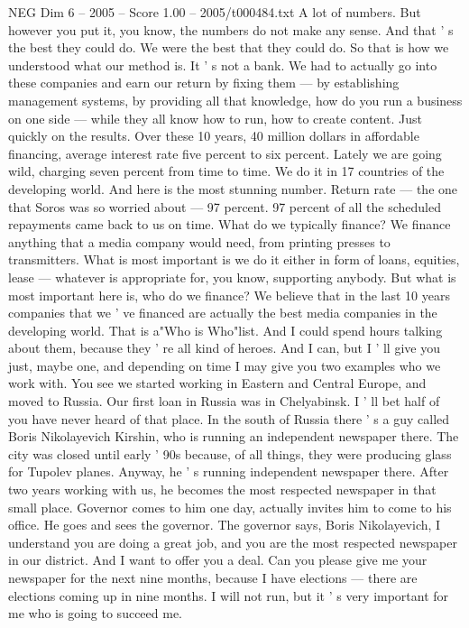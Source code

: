 \begin{textsample}{NEG Dim 6 – 2005 – Score 1.00 – 2005/t000484.txt}
A lot of numbers.
But however you put it, you know, the numbers do not make any sense.
And that ' s the best they could do.
We were the best that they could do.
So that is how we understood what our method is.
It ' s not a bank.
We had to actually go into these companies and earn our return by fixing them — by establishing management systems, by providing all that knowledge, how do you run a business on one side — while they all know how to run, how to create content.
Just quickly on the results.
Over these 10 years, 40 million dollars in affordable financing, average interest rate five percent to six percent.
Lately we are going wild, charging seven percent from time to time.
We do it in 17 countries of the developing world.
And here is the most stunning number.
Return rate — the one that Soros was so worried about — 97 percent. 97 percent of all the scheduled repayments came back to us on time.
What do we typically finance?
We finance anything that a media company would need, from printing presses to transmitters.
What is most important is we do it either in form of loans, equities, lease — whatever is appropriate for, you know, supporting anybody.
But what is most important here is, who do we finance?
We believe that in the last 10 years companies that we ' ve financed are actually the best media companies in the developing world.
That is a"Who is Who"list.
And I could spend hours talking about them, because they ' re all kind of heroes.
And I can, but I ' ll give you just, maybe one, and depending on time I may give you two examples who we work with.
You see we started working in Eastern and Central Europe, and moved to Russia.
Our first loan in Russia was in Chelyabinsk.
I ' ll bet half of you have never heard of that place.
In the south of Russia there ' s a guy called Boris Nikolayevich Kirshin, who is running an independent newspaper there.
The city was closed until early ' 90s because, of all things, they were producing glass for Tupolev planes.
Anyway, he ' s running independent newspaper there.
After two years working with us, he becomes the most respected newspaper in that small place.
Governor comes to him one day, actually invites him to come to his office.
He goes and sees the governor.
The governor says, Boris Nikolayevich, I understand you are doing a great job, and you are the most respected newspaper in our district.
And I want to offer you a deal.
Can you please give me your newspaper for the next nine months, because I have elections — there are elections coming up in nine months.
I will not run, but it ' s very important for me who is going to succeed me.

\end{textsample}
